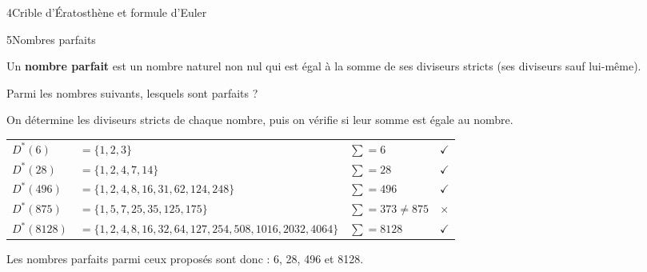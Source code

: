 \begin{exercice}{4}{Crible d'Ératosthène et formule d'Euler}
\end{exercice}


\begin{exercice}{5}{Nombres parfaits}

\begin{mdframed}[backgroundcolor=vlmgray, innerleftmargin=10pt, innerrightmargin=10pt, innertopmargin=6pt, innerbottommargin=6pt, skipabove=-5pt, skipbelow=5pt]
Un \textbf{nombre parfait} est un nombre naturel non nul qui est égal à la somme de ses diviseurs stricts (ses diviseurs sauf lui-même).
\end{mdframed}


\bigskip
Parmi les nombres suivants, lesquels sont parfaits ?

\bigskip
{}%
{
On détermine les diviseurs stricts de chaque nombre, puis on vérifie si leur somme est égale au nombre.

\vspace{20pt}
\def\arraystretch{1.2}
\begin{tabularx}{\linewidth}{lXlc}
$D^*(6)$    & $= \{1, 2, 3\}$ & $\sum = 6$    & $\checkmark$ \\
$D^*(28)$   & $= \{1, 2, 4, 7, 14\}$                                             & $\sum = 28$  & $\checkmark$ \\
$D^*(496)$  & $= \{1, 2, 4, 8, 16, 31, 62, 124, 248\}$                           & $\sum = 496$  & $\checkmark$ \\
$D^*(875)$  & $= \{1, 5, 7, 25, 35, 125, 175\}$                                  & $\sum = 373 \neq 875$ & $\times$ \\
$D^*(8128)$ & $= \{1, 2, 4, 8, 16, 32, 64, 127, 254, 508, 1016, 2032, 4064\}$   & $\sum = 8128$ & $\checkmark$ \\
\end{tabularx}
\def\arraystretch{1}

\vspace{20pt}
Les nombres parfaits parmi ceux proposés sont donc : 6, 28, 496 et 8128.
}
\end{exercice}


